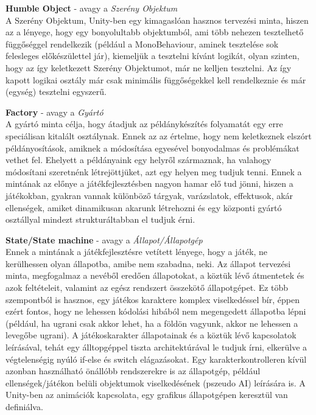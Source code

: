 \textbf{Humble Object} - avagy a \textit{Szerény Objektum}\\
A Szerény Objektum, Unity-ben egy kimagaslóan hasznos tervezési minta, hiszen az a lényege, hogy egy bonyolultabb objektumból, ami több nehezen tesztelhető függőséggel rendelkezik (például a MonoBehaviour, aminek tesztelése sok felesleges előkészülettel jár), kiemeljük a tesztelni kívánt logikát, olyan szinten, hogy az így keletkezett Szerény Objektumot, már ne kelljen tesztelni. Az így kapott logikai osztály már csak minimális függőségekkel kell rendelkeznie és már (egység) tesztelni egyszerű.

\textbf{Factory} - avagy a \textit{Gyártó}\\
A gyártó minta célja, hogy átadjuk az példánykészítés folyamatát egy erre speciálisan kitalált osztálynak. Ennek az az értelme, hogy nem keletkeznek elszórt példányosítások, amiknek a módosítása egyesével bonyodalmas és problémákat vethet fel. Ehelyett a példányaink egy helyről származnak, ha valahogy módosítani szeretnénk létrejöttjüket, azt egy helyen meg tudjuk tenni. Ennek a mintának az előnye a játékfejlesztésben nagyon hamar elő tud jönni, hiszen a játékokban, gyakran vannak különböző tárgyak, varázslatok, effektusok, akár ellenségek, amiket dinamikusan akarunk létrehozni és egy központi gyártó osztállyal mindezt strukturáltabban el tudjuk érni.

\textbf{State/State machine} - avagy a \textit{Állapot/Állapotgép}\\
Ennek a mintának a játékfejlesztésre vetített lényege, hogy a játék, ne kerülhessen olyan állapotba, amibe nem szabadna, neki. Az állapot tervezési minta, megfogalmaz a nevéből eredően állapotokat, a köztük lévő átmentetek és azok feltételeit, valamint az egész rendszert összekötő állapotgépet. Ez több szempontból is hasznos, egy játékos karaktere komplex viselkedéssel bír, éppen ezért fontos, hogy ne lehessen kódolási hibából nem megengedett állapotba lépni (például, ha ugrani csak akkor lehet, ha a földön vagyunk, akkor ne lehessen a levegőbe ugrani). A játékoskarakter állapotainak és a köztük lévő kapcsolatok leírásával, tehát egy álltopgéppel tiszta architektúrával le tudjuk írni, elkerülve a végtelenségig nyúló if-else és switch elágazásokat. Egy karakterkontrolleren kívül azonban használható önállóbb rendszerekre is az állapotgép, például ellenségek/játékon belüli objektumok viselkedésének (pszeudo AI) leírására is. A Unity-ben az animációk kapcsolata, egy grafikus állapotgépen keresztül van definiálva.

